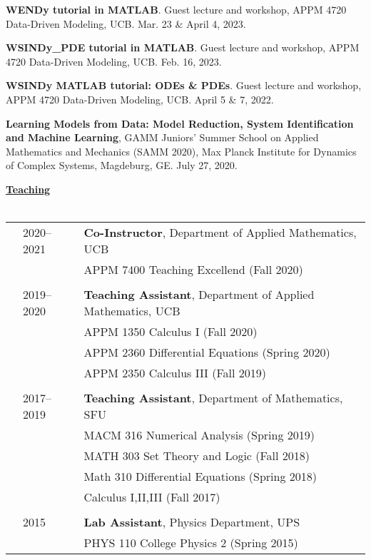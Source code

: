 \documentclass[letterpaper,11pt,oneside]{article}
\newcommand{\headr}[1]{\vspace{10pt}\uline{\Large{\textbf{#1}} \hfill } \\ \vspace{-10pt}\\}
\begin{document}
\begin{enumerate}[label={[\arabic*]}]
\item \textbf{WENDy tutorial in MATLAB}. Guest lecture and workshop, APPM 4720 Data-Driven Modeling, UCB. Mar. 23 \& April 4, 2023.
\item \textbf{WSINDy\_PDE tutorial in MATLAB}. Guest lecture and workshop, APPM 4720 Data-Driven Modeling, UCB. Feb. 16, 2023.
\item \textbf{WSINDy MATLAB tutorial: ODEs \& PDEs}. Guest lecture and workshop, APPM 4720 Data-Driven Modeling, UCB. April 5 \& 7, 2022.
\item \textbf{Learning Models from Data: Model Reduction, System Identification and Machine Learning}, GAMM Juniors' Summer School on Applied Mathematics and Mechanics (SAMM 2020), Max Planck Institute for Dynamics of Complex Systems, Magdeburg, GE. July 27, 2020.
\end{enumerate}

\headr{Teaching}

\begin{tabular}{@{} p{0.01cm} p{2cm} p{14cm}}
& 2020--2021 & \textbf{Co-Instructor}, Department of Applied Mathematics, UCB \\
&     & APPM 7400 Teaching Excellend (Fall 2020)\\
&&\\
& 2019-- 2020 & \textbf{Teaching Assistant}, Department of Applied Mathematics, UCB \\
&     & APPM 1350 Calculus I (Fall 2020)\\
&     & APPM 2360 Differential Equations (Spring 2020)\\
&     & APPM 2350 Calculus III (Fall 2019)\\
&&\\
& 2017--2019  & \textbf{Teaching Assistant}, Department of Mathematics, SFU  \\
&     & MACM 316 Numerical Analysis (Spring 2019) \\
&     & MATH 303 Set Theory and Logic (Fall 2018) \\ 
&     & Math 310 Differential Equations (Spring 2018) \\ 
&     & Calculus I,II,III (Fall 2017)\\
&&\\
& 2015  &\textbf{Lab Assistant}, Physics Department, UPS \\
&     & PHYS 110 College Physics 2 (Spring 2015) \\
\end{tabular}
\end{document}
